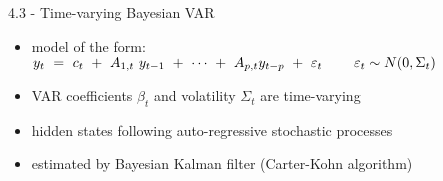 \begin{frame}{4.3 - Time-varying Bayesian VAR}
	\begin{itemize}
		\item model of the form: \\ \vspace{2mm}
		$y_t \ = \ c_t \ + \ A_{1,t} \ y_{t-1} \ + \ \cdots \ + \ A_{p,t} y_{t-p} \ + \ \varepsilon_t \hspace{8mm}
		\varepsilon_t \sim N(0, \Sigma_t)$ \vspace{-1mm}
		\item VAR coefficients $\beta_t$ and volatility $\Sigma_t$ are time-varying \vspace{2mm}
		\item hidden states following auto-regressive stochastic processes \vspace{2mm}
		\item estimated by Bayesian Kalman filter (Carter-Kohn algorithm)
	\end{itemize}
\end{frame}



